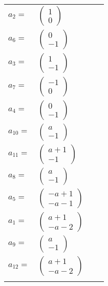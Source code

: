\documentclass[1p]{elsarticle_modified}
\theoremstyle{definition}
\begin{document}
\begin{tabular}{m{7pt} m{180pt} m{7pt} m{180pt} }
\flushright $a_{2}=$&$\begin{pmatrix}1\\0\end{pmatrix}$ \\
\flushright $a_{6}=$&$\begin{pmatrix}0\\-1\end{pmatrix}$ \\
\flushright $a_{3}=$&$\begin{pmatrix}1\\-1\end{pmatrix}$ \\
\flushright $a_{7}=$&$\begin{pmatrix}-1\\0\end{pmatrix}$ \\
\flushright $a_{4}=$&$\begin{pmatrix}0\\-1\end{pmatrix}$ \\
\flushright $a_{10}=$&$\begin{pmatrix}a\\-1\end{pmatrix}$ \\
\flushright $a_{11}=$&$\begin{pmatrix}a+1\\-1\end{pmatrix}$ \\
\flushright $a_{8}=$&$\begin{pmatrix}a\\-1\end{pmatrix}$ \\
\flushright $a_{5}=$&$\begin{pmatrix}- a+1\\- a-1\end{pmatrix}$ \\
\flushright $a_{1}=$&$\begin{pmatrix}a+1\\- a-2\end{pmatrix}$ \\
\flushright $a_{9}=$&$\begin{pmatrix}a\\-1\end{pmatrix}$ \\
\flushright $a_{12}=$&$\begin{pmatrix}a+1\\- a-2\end{pmatrix}$\\&\end{tabular}
\end{document}
